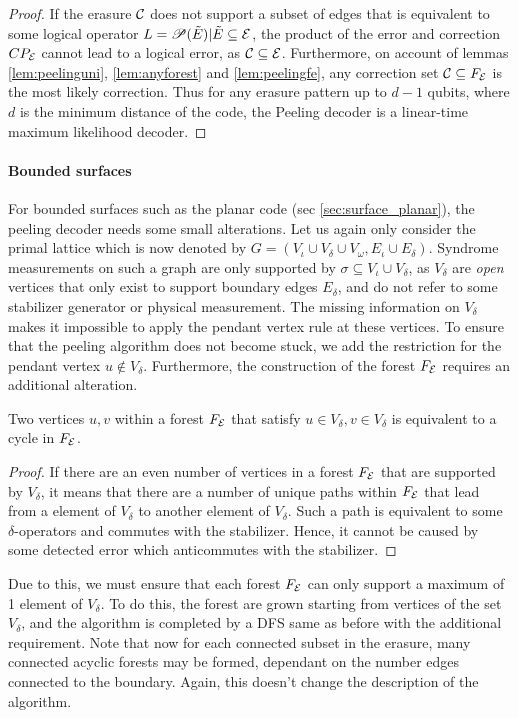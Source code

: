 \begin{proof}
  If the erasure $\mathcal{C}$ does not support a subset of edges that is equivalent to some logical operator $L=\mathscr{P}(\tilde{E})|\tilde{E}\subseteq\mathcal{E}$, the product of the error and correction $CP_{\mathcal{E}}$ cannot lead to a logical error, as $\mathcal{C}\subseteq \mathcal{E}$. Furthermore, on account of lemmas \ref{lem:peelinguni}, \ref{lem:anyforest} and \ref{lem:peelingfe}, any correction set $\mathcal{C}\subseteq F_{\mathcal{E}}$ is the most likely correction. Thus for any erasure pattern up to $d-1$ qubits, where $d$ is the minimum distance of the code, the Peeling decoder is a linear-time maximum likelihood decoder. 
\end{proof}

\paragraph{Bounded surfaces}
For bounded surfaces such as the planar code (sec \ref{sec:surface_planar}), the peeling decoder needs some small alterations. Let us again only consider the primal lattice which is now denoted by $G = (V_\iota\cup V_{\delta} \cup V_{\omega}, E_\iota \cup E_{\delta})$. Syndrome measurements on such a graph are only supported by $\sigma \subseteq V_\iota\cup V_\delta$, as $V_\delta$ are \emph{open} vertices that only exist to support boundary edges $E_\delta$, and do not refer to some stabilizer generator or physical measurement. The missing information on $V_\delta$ makes it impossible to apply the pendant vertex rule at these vertices. To ensure that the peeling algorithm does not become stuck, we add the restriction for the pendant vertex $u \notin V_\delta$. Furthermore, the construction of the forest $F_{\mathcal{E}}$ requires an additional alteration.
\begin{lemma}
  Two vertices $u,v$ within a forest $F_{\mathcal{E}}$ that satisfy $u\in V_\delta, v \in V_\delta$ is equivalent to a cycle in $F_{\mathcal{E}}$. 
\end{lemma}
\begin{proof}
  If there are an even number of vertices in a forest $F_{\mathcal{E}}$ that are supported by $V_\delta$, it means that there are a number of unique paths within $F_{\mathcal{E}}$ that lead from a element of $V_\delta$ to another element of $V_\delta$. Such a path is equivalent to some $\delta$-operators and commutes with the stabilizer. Hence, it cannot be caused by some detected error which anticommutes with the stabilizer.
\end{proof}
Due to this, we must ensure that each forest $F_{\mathcal{E}}$ can only support a maximum of 1 element of $V_\delta$. To do this, the forest are grown starting from vertices of the set $V_\delta$, and the algorithm is completed by a DFS same as before with the additional requirement. Note that now for each connected subset in the erasure, many connected acyclic forests may be formed, dependant on the number edges connected to the boundary. Again, this doesn't change the description of the algorithm.

